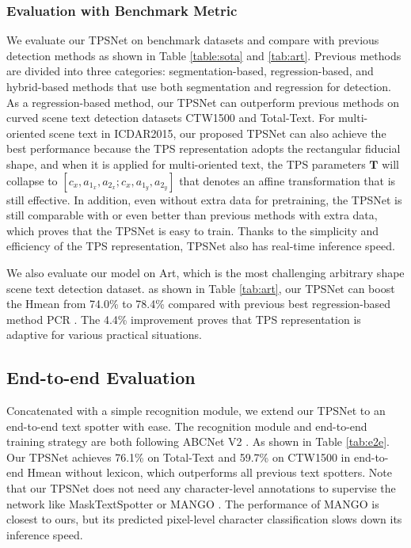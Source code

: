 \documentclass[sigconf]{acmart}
\begin{document}
	\subsubsection{Evaluation with Benchmark Metric}
	We evaluate our TPSNet on benchmark datasets and compare with previous detection methods as shown in Table \ref{table:sota} and \ref{tab:art}. Previous methods are divided into three categories: segmentation-based, regression-based, and hybrid-based methods that use both segmentation and regression for detection.  As a regression-based method, our TPSNet can outperform previous methods on curved scene text detection datasets CTW1500 and Total-Text.
	For multi-oriented scene text in ICDAR2015, our proposed TPSNet can also achieve the best performance because the TPS representation adopts the rectangular fiducial shape, and when it is applied for multi-oriented text, the TPS parameters $\mathbf{T}$ will collapse to $[c_x , a_{1_x} , a_{2_x}; c_x , a_{1_y} , a_{2_y}]$ that denotes an affine transformation that is still effective.
In addition, even without extra data for pretraining, the TPSNet is still comparable with or even better than previous methods with extra data, which proves that the TPSNet is easy to train.  Thanks to the simplicity and efficiency of the TPS representation, TPSNet also has real-time inference speed.
	
	We also evaluate our model on Art, which is the most challenging arbitrary shape scene text detection dataset. as shown in Table \ref{tab:art}, our TPSNet can boost the Hmean from 74.0\% to 78.4\% compared with previous best regression-based method PCR \cite{dai2021progressive}. The 4.4\% improvement proves that TPS representation is adaptive for various practical situations.
	
	
	
	\subsection{
End-to-end Evaluation}
	Concatenated with a simple recognition module, we extend our TPSNet to an end-to-end text spotter with ease. The recognition module and end-to-end training strategy are both following ABCNet V2 \cite{abcnetv2}. As shown in Table \ref{tab:e2e}. Our TPSNet achieves 76.1\% on Total-Text and 59.7\% on CTW1500 in end-to-end Hmean without lexicon, which outperforms all previous text spotters. Note that our TPSNet does not need any character-level annotations to supervise the network like MaskTextSpotter \cite{liao2020masktextspotterv3} or MANGO \cite{qiao2021mango}. The performance of MANGO \cite{qiao2021mango} is closest to ours, but its predicted pixel-level character classification slows down its inference speed.
	
\end{document}
